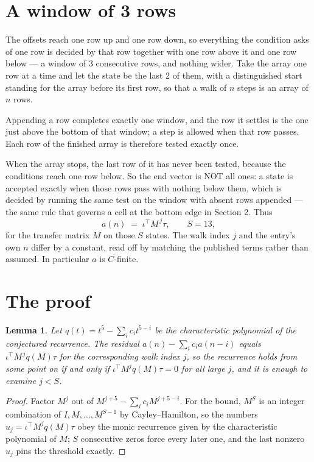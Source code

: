 \documentclass[11pt,a4paper]{article}
\theoremstyle{plain}
\newtheorem{lemma}[theorem]{Lemma}
\theoremstyle{definition}
\begin{document}
\section{A window of 3 rows}

The offsets reach one row up and one row down, so everything the condition asks of one row is
decided by that row together with one row above it and one row below --- a window of
$3$ consecutive rows, and nothing wider. Take the array one row at a time
and let the state be the last 2 of them, with a distinguished start standing for the
array before its first row, so that a walk of $n$ steps is an array of $n$ rows.

Appending a row completes exactly one window, and the row it settles is the one just above the bottom of that window; a step is
allowed when that row passes. Each row of the finished
array is therefore tested exactly once.

When the array stops, the last row of it has never been tested, because the
conditions reach one row below. So the end vector is NOT all ones: a state is accepted exactly when
those rows pass with nothing below them, which is decided by running the same test on the window
with absent rows appended --- the same rule that governs a cell at the bottom edge in
Section 2.
Thus
\[
a(n)\;=\;\iota^{\!\top}M^{\,j}\tau ,\qquad S=13,
\]
for the transfer matrix $M$ on those $S$ states. The walk index $j$ and the entry's own $n$
differ by a constant, read off by matching the published terms rather than assumed. In
particular $a$ is $C$-finite.

\section{The proof}

\begin{lemma}\label{lem:crit}
Let $q(t)=t^{5}-\sum_i c_it^{5-i}$ be the characteristic polynomial of the
conjectured recurrence. The residual $a(n)-\sum_ic_ia(n-i)$ equals
$\iota^{\!\top}M^{\,j}q(M)\tau$ for the corresponding walk index $j$, so the recurrence
holds from some point on if and only if $\iota^{\!\top}M^{j}q(M)\tau=0$ for all large $j$,
and it is enough to examine $j<S$.
\end{lemma}

\begin{proof}
Factor $M^{j}$ out of $M^{j+5}-\sum_ic_iM^{j+5-i}$. For the bound, $M^{S}$
is an integer combination of $I,M,\dots,M^{S-1}$ by Cayley--Hamilton, so the numbers
$u_j=\iota^{\!\top}M^{j}q(M)\tau$ obey the monic recurrence given by the characteristic
polynomial of $M$; $S$ consecutive zeros force every later one, and the last nonzero $u_j$
pins the threshold exactly.
\end{proof}
\end{document}
